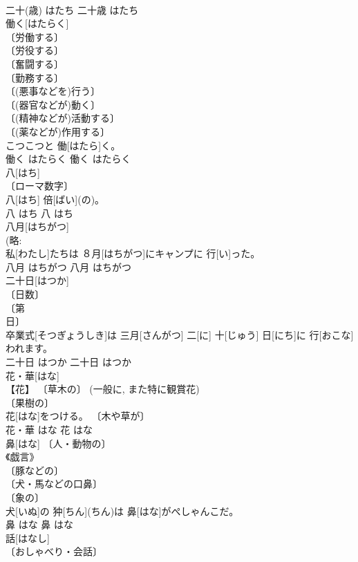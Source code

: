 \documentclass[8pt]{extreport}
\begin{document}
\begin{CJK}{UTF8}{min}
\\	二十(歳)	はたち	二十歳	はたち	
\\	働く[はたらく]	
\\	〔労働する〕 
\\	〔労役する〕 
\\	〔奮闘する〕 
\\	〔勤務する〕 
\\	〔(悪事などを)行う〕 
\\	〔(器官などが)動く〕 
\\	〔(精神などが)活動する〕 
\\	〔(薬などが)作用する〕 
\\	こつこつと 働[はたら]く。	
\\	働く	はたらく	働く	はたらく	
\\	八[はち]	
\\	〔ローマ数字〕 
\\	八[はち] 倍[ばい](の)。	
\\	八	はち	八	はち	
\\	八月[はちがつ]	
\\	(略: 
\\	私[わたし]たちは ８月[はちがつ]にキャンプに 行[い]った。	
\\	八月	はちがつ	八月	はちがつ	
\\	二十日[はつか]	
\\	〔日数〕 
\\	〔第 
\\	日〕 
\\	卒業式[そつぎょうしき]は 三月[さんがつ] 二[に] 十[じゅう] 日[にち]に 行[おこな]われます。	
\\	二十日	はつか	二十日	はつか	
\\	花・華[はな]	
\\	【花】 〔草木の〕 (一般に, また特に観賞花) 
\\	〔果樹の〕 
\\	花[はな]をつける。	〔木や草が〕 
\\	花・華	はな	花	はな	
\\	鼻[はな]	〔人・動物の〕 
\\	《戯言》 
\\	〔豚などの〕 
\\	〔犬・馬などの口鼻〕 
\\	〔象の〕 
\\	犬[いぬ]の 狆[ちん](ちん)は 鼻[はな]がぺしゃんこだ。	
\\	鼻	はな	鼻	はな	
\\	話[はなし]	
\\	〔おしゃべり・会話〕 

\end{CJK}
\end{document}
